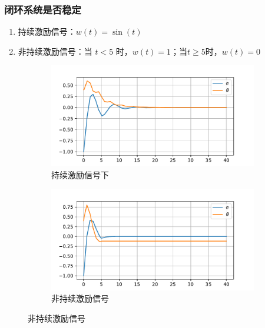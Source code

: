 \begin{frame}
    \frametitle{闭环系统是否稳定}

    \begin{enumerate}
        \item 持续激励信号：$w(t)=\sin(t)$
        \item 非持续激励信号：当 $t< 5$ 时，$w(t)=1$；当$t\geq 5$时，$w(t)=0$
    \end{enumerate}

    \begin{figure}
        \begin{subfigure}[b]{0.45\textwidth}
            \includegraphics[width=\linewidth]{figure/simple-pe.pdf}
            \caption{持续激励信号下}
        \end{subfigure}
        \begin{subfigure}[b]{0.45\textwidth}
            \includegraphics[width=\linewidth]{figure/simple-npe.pdf}
            \caption{非持续激励信号}
        \end{subfigure}
    \end{figure}
\end{frame}